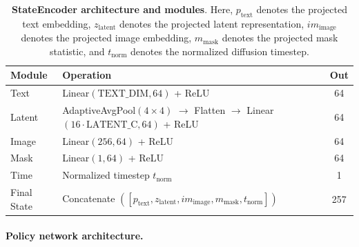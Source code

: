 \begin{table}[t]
\centering
\small
\caption{
\textbf{StateEncoder architecture and modules}.
Here, $p_{\text{text}}$ denotes the projected text embedding,
$z_{\text{latent}}$ denotes the projected latent representation,
$im_{\text{image}}$ denotes the projected image embedding,
$m_{\text{mask}}$ denotes the projected mask statistic,
and $t_{\text{norm}}$ denotes the normalized diffusion timestep.
}
\label{tab:stateencoder}
\setlength{\tabcolsep}{4pt}
\begin{tabular}{lp{4.8cm}c}
\toprule
\textbf{Module} & \textbf{Operation} & \textbf{Out} \\
\midrule

Text &
Linear$(\mathrm{TEXT\_DIM},64)$ + ReLU &
64 \\

Latent &
AdaptiveAvgPool$(4\times4)$ $\rightarrow$ Flatten $\rightarrow$
Linear$(16\!\cdot\!\mathrm{LATENT\_C},64)$ + ReLU &
64 \\

Image &
Linear$(256,64)$ + ReLU &
64 \\

Mask &
Linear$(1,64)$ + ReLU &
64 \\

Time &
Normalized timestep $t_{\text{norm}}$ &
1 \\
Final State &
Concatenate $([p_{\text{text}}, z_{\text{latent}}, im_{\text{image}}, m_{\text{mask}}, t_{\text{norm}}])$ &
257 \\
\bottomrule
\end{tabular}
\end{table}
\paragraph{Policy network architecture.}

